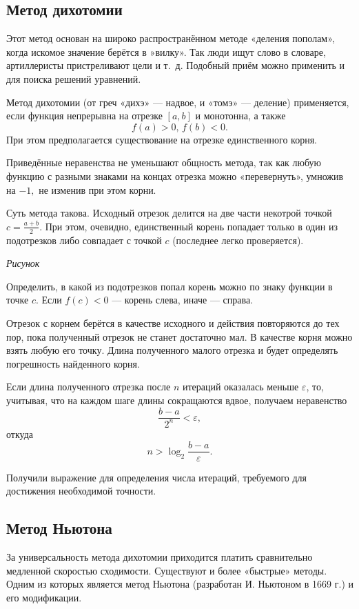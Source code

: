\subsection{Метод дихотомии}

Этот метод основан на широко распространённом методе «деления
  пополам», когда искомое значение берётся в »вилку». Так люди ищут
    слово в словаре, артиллеристы пристреливают цели и т.~д. Подобный
    приём можно применить и для поиска решений уравнений.

Метод дихотомии (от греч «дихэ» — надвое, и «томэ» — деление)
применяется, если функция непрерывна на отрезке $[a,b]$ и монотонна, а
также
\[
f(a)>0,\, f(b)<0.
\]
При этом предполагается существование на отрезке единственного корня.

Приведённые неравенства не уменьшают общность метода, так как любую
функцию с разными знаками на концах отрезка можно «перевернуть»,
умножив на $-1,$ не изменив при этом корни.

Суть метода такова. Исходный отрезок делится на две части некотрой
точкой $c=\frac{a+b}{2}$. При этом, очевидно, единственный корень
попадает только в один из подотрезков либо совпадает с точкой $c$
(последнее легко проверяется).

\emph{Рисунок}

Определить, в какой из подотрезков попал корень можно по знаку функции
в точке $c$. Если $f(c)<0$ — корень слева, иначе — справа.

Отрезок с корнем берётся в качестве исходного и действия повторяются
до тех пор, пока полученный отрезок не станет достаточно мал. В
качестве корня можно взять любую его точку. Длина полученного малого
отрезка и будет определять погрешность найденного корня.

Если длина полученного отрезка после $n$ итераций оказалась меньше
$\varepsilon$, то, учитывая, что на каждом шаге длины сокращаются
вдвое, получаем неравенство
\[
\frac{b-a}{2^{n}}<\varepsilon,
\]
откуда
\[
n>\log_{2}\frac{b-a}{\varepsilon}.
\]


Получили выражение для определения числа итераций, требуемого для
достижения необходимой точности.


\subsection{Метод Ньютона}

За универсальность метода дихотомии приходится платить сравнительно
медленной скоростью сходимости. Существуют и более «быстрые» методы.
Одним из которых является метод Ньютона (разработан И. Ньютоном в
1669 г.) и его модификации.

